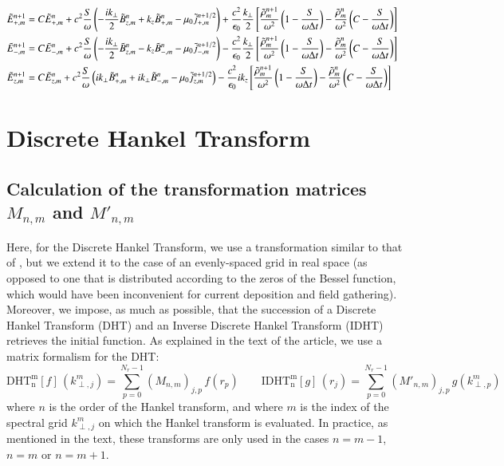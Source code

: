 \begin{subequations}
\begin{align}
\tilde{E}_{+,m}^{n+1} = \; & C \tilde{E}_{+,m}^{n} + 
c^2\frac{S}{\omega}\left(-\frac{ik_\perp }{2} \tilde{B}_{z,m}^{n} + k_z\tilde{B}_{+,m}^{n}
- \mu_0 \tilde{j}_{+,m}^{n+1/2} \right) + \frac{c^2}{\epsilon_0}
\frac{k_\perp}{2}\left[ \frac{\tilde{\rho}_{m}^{n+1}}{\omega^2}\left(
  1 - \frac{S}{\omega\Delta t}\right) -
\frac{\tilde{\rho}_{m}^{n}}{\omega^2}\left( C -\frac{S}{\omega\Delta t}\right)\right]  & \\
\tilde{E}_{-,m}^{n+1} =\; & C \tilde{E}_{-,m}^{n} +
c^2\frac{S}{\omega}\left(- \frac{ik_\perp }{2} \tilde{B}_{z,m}^{n} - k_z\tilde{B}_{-,m}^{n}
- \mu_0 \tilde{j}_{-,m}^{n+1/2} \right) - \frac{c^2}{\epsilon_0}
\frac{k_\perp}{2}\left[ \frac{\tilde{\rho}_{m}^{n+1}}{\omega^2}\left(
  1 - \frac{S}{\omega\Delta t}\right) - \frac{\tilde{\rho}_{m}^{n}}{\omega^2}
\left( C - \frac{S}{\omega\Delta t}\right)\right]  &\\
\tilde{E}_{z,m}^{n+1} =\; & C \tilde{E}_{z,m}^{n} + 
c^2\frac{S}{\omega}\left(ik_\perp \tilde{B}_{+,m}^{n} + ik_\perp \tilde{B}_{-,m}^{n}
- \mu_0 \tilde{j}_{z,m}^{n+1/2} \right) - \frac{c^2}{\epsilon_0}
ik_z\left[ \frac{\tilde{\rho}_{m}^{n+1}}{\omega^2}\left(
  1 - \frac{S}{\omega\Delta t}\right) - \frac{\tilde{\rho}_{m}^{n}}{\omega^2}
\left( C - \frac{S}{\omega\Delta t}\right)\right]  &
\end{align}
\end{subequations}

\section{Discrete Hankel Transform}
\label{sec:HTMatrix}

\subsection{Calculation of the transformation matrices $M_{n,m}$ and $M'_{n,m}$}

Here, for the Discrete Hankel Transform, we use a transformation
similar to that of \cite{Yu,Guizar,KaiMing}, but
we extend it to the case of an evenly-spaced grid in real space (as opposed to one
that is distributed according to the zeros of the Bessel
function, which would have been inconvenient for current deposition
and field gathering). Moreover, we impose, as much as possible, that the
succession of a Discrete Hankel Transform (DHT) and an Inverse Discrete
Hankel Transform (IDHT) retrieves the initial function. As explained in
the text of the article, we use a matrix formalism for the DHT:
\begin{equation} \mathrm{DHT^m_n}[f] \,(k^m_{\perp,j}) = \sum_{p=0}^{N_r-1} (M_{n,m})_{j,p}
\,f(r_p) \qquad \mathrm{IDHT^m_n}[g] \, (r_j) = \sum_{p=0}^{N_r-1}
(M'_{n,m})_{j,p} \,g(k^m_{\perp,p}) \end{equation}
\noindent where $n$ is the order of the Hankel transform, and where
$m$ is the index of the spectral grid
$k^m_{\perp,j}$ on which the Hankel transform is evaluated. 
In practice, as mentioned in the text, these
transforms are only used in the cases $n=m-1$, $n=m$ or $n=m+1$.


